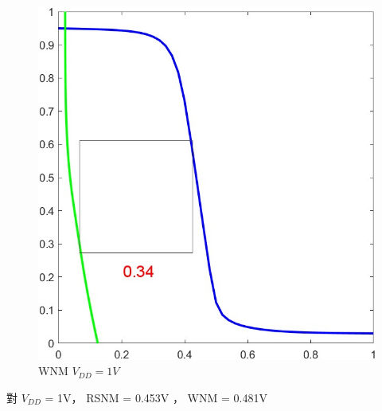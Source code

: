 \documentclass{article}
\begin{document}
\begin{figure}[H]
\begin{minipage}[t]{0.28\textwidth}
    \includegraphics[width=\textwidth]{./img/2023-11-12-04-03-55.png}
\caption{WNM $V_{DD} = 1V$}
\label{8wnm1}
\end{minipage}
\end{figure}

\vspace*{-1cm}
對 $V_{DD}$ = 1V， RSNM = 0.453V ， WNM = 0.481V
\end{document}
